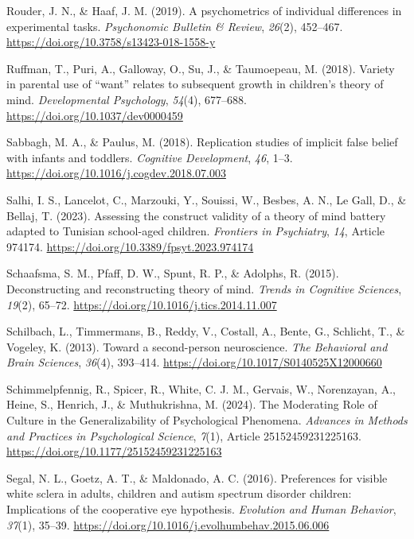 \documentclass[
]{scrbook}
\newlength{\cslhangindent}
\newenvironment{CSLReferences}[2] %
 {\begin{list}{}{%
  \setlength{\itemindent}{0pt}
  \setlength{\leftmargin}{0pt}
  \setlength{\parsep}{0pt}
  \ifodd #1
   \setlength{\leftmargin}{\cslhangindent}
   \setlength{\itemindent}{-1\cslhangindent}
  \fi
  \setlength{\itemsep}{#2\baselineskip}}}
 {\end{list}}
\begin{document}
\begin{CSLReferences}{1}{0}
Rouder, J. N., \& Haaf, J. M. (2019). A psychometrics of individual differences in experimental tasks. \emph{Psychonomic Bulletin \& Review}, \emph{26}(2), 452--467. \url{https://doi.org/10.3758/s13423-018-1558-y}

Ruffman, T., Puri, A., Galloway, O., Su, J., \& Taumoepeau, M. (2018). Variety in parental use of {``want''} relates to subsequent growth in children's theory of mind. \emph{Developmental Psychology}, \emph{54}(4), 677--688. \url{https://doi.org/10.1037/dev0000459}

Sabbagh, M. A., \& Paulus, M. (2018). Replication studies of implicit false belief with infants and toddlers. \emph{Cognitive Development}, \emph{46}, 1--3. \url{https://doi.org/10.1016/j.cogdev.2018.07.003}

Salhi, I. S., Lancelot, C., Marzouki, Y., Souissi, W., Besbes, A. N., Le Gall, D., \& Bellaj, T. (2023). Assessing the construct validity of a theory of mind battery adapted to {Tunisian} school-aged children. \emph{Frontiers in Psychiatry}, \emph{14}, Article 974174. \url{https://doi.org/10.3389/fpsyt.2023.974174}

Schaafsma, S. M., Pfaff, D. W., Spunt, R. P., \& Adolphs, R. (2015). Deconstructing and reconstructing theory of mind. \emph{Trends in Cognitive Sciences}, \emph{19}(2), 65--72. \url{https://doi.org/10.1016/j.tics.2014.11.007}

Schilbach, L., Timmermans, B., Reddy, V., Costall, A., Bente, G., Schlicht, T., \& Vogeley, K. (2013). Toward a second-person neuroscience. \emph{The Behavioral and Brain Sciences}, \emph{36}(4), 393--414. \url{https://doi.org/10.1017/S0140525X12000660}

Schimmelpfennig, R., Spicer, R., White, C. J. M., Gervais, W., Norenzayan, A., Heine, S., Henrich, J., \& Muthukrishna, M. (2024). The {Moderating Role} of {Culture} in the {Generalizability} of {Psychological Phenomena}. \emph{Advances in Methods and Practices in Psychological Science}, \emph{7}(1), Article 25152459231225163. \url{https://doi.org/10.1177/25152459231225163}

Segal, N. L., Goetz, A. T., \& Maldonado, A. C. (2016). Preferences for visible white sclera in adults, children and autism spectrum disorder children: Implications of the cooperative eye hypothesis. \emph{Evolution and Human Behavior}, \emph{37}(1), 35--39. \url{https://doi.org/10.1016/j.evolhumbehav.2015.06.006}


\end{CSLReferences}
\end{document}
